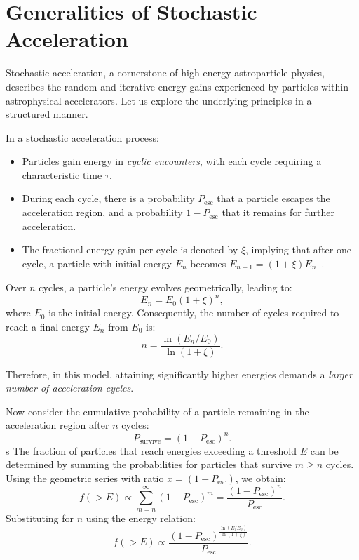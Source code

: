 \section{Generalities of Stochastic Acceleration}

Stochastic acceleration, a cornerstone of high-energy astroparticle physics, describes the random and iterative energy gains experienced by particles within astrophysical accelerators. Let us explore the underlying principles in a structured manner.

In a stochastic acceleration process:
%
\begin{itemize}
\item Particles gain energy in \emph{cyclic encounters}, with each cycle requiring a characteristic time \( \tau \). 
\item During each cycle, there is a probability \( P_{\text{esc}} \) that a particle escapes the acceleration region, and a probability \( 1 - P_{\text{esc}} \) that it remains for further acceleration. 
\item The fractional energy gain per cycle is denoted by \( \xi \), implying that after one cycle, a particle with initial energy \( E_n \) becomes \( E_{n+1} = (1 + \xi) E_n \)~.
\end{itemize}

Over \( n \) cycles, a particle's energy evolves geometrically, leading to:
\[
E_n = E_0 (1 + \xi)^n,
\]
where \( E_0 \) is the initial energy. Consequently, the number of cycles required to reach a final energy \( E_n \) from \( E_0 \) is:
\[
n = \frac{\ln \left( E_n/E_0 \right)}{\ln (1 + \xi)}.
\]

Therefore, in this model, attaining significantly higher energies demands a \emph{larger number of acceleration cycles}.

Now consider the cumulative probability of a particle remaining in the acceleration region after \( n \) cycles:
\[
P_{\text{survive}} = (1 - P_{\text{esc}})^n.
\]
s
The fraction of particles that reach energies exceeding a threshold \( E \) can be determined by summing the probabilities for particles that survive \( m \geq n \) cycles. Using the geometric series with ratio \( x = (1 - P_{\text{esc}}) \), we obtain:
\[
f(>E) \propto \sum_{m=n}^\infty (1 - P_{\text{esc}})^m = \frac{(1-P_{\text{esc}})^n}{P_{\text{esc}}}.
\]
Substituting for \( n \) using the energy relation:
\[
f(>E) \propto \frac{(1-P_{\text{esc}})^{\frac{\ln \left( E/E_0 \right)}{\ln (1 + \xi)}}}{P_{\text{esc}}}.
\]

